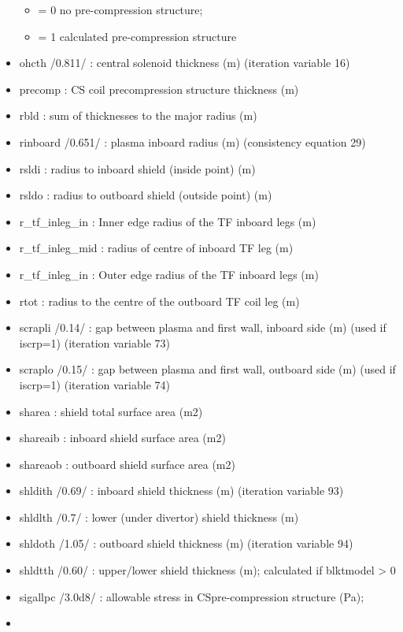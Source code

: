\documentclass[]{article}
\providecommand{\tightlist}{%
  \setlength{\itemsep}{0pt}\setlength{\parskip}{0pt}}
\begin{document}
\begin{itemize}
  \begin{itemize}
  \tightlist
  \item
    = 0 no pre-compression structure;
  \item
    = 1 calculated pre-compression structure
  \end{itemize}
\item
  ohcth /0.811/ : central solenoid thickness (m) (iteration variable 16)
\item
  precomp : CS coil precompression structure thickness (m)
\item
  rbld : sum of thicknesses to the major radius (m)
\item
  rinboard /0.651/ : plasma inboard radius (m) (consistency equation 29)
\item
  rsldi : radius to inboard shield (inside point) (m)
\item
  rsldo : radius to outboard shield (outside point) (m)
\item
  r\_tf\_inleg\_in : Inner edge radius of the TF inboard legs (m)
\item
  r\_tf\_inleg\_mid : radius of centre of inboard TF leg (m)
\item
  r\_tf\_inleg\_in : Outer edge radius of the TF inboard legs (m)
\item
  rtot : radius to the centre of the outboard TF coil leg (m)
\item
  scrapli /0.14/ : gap between plasma and first wall, inboard side (m)
  (used if iscrp=1) (iteration variable 73)
\item
  scraplo /0.15/ : gap between plasma and first wall, outboard side (m)
  (used if iscrp=1) (iteration variable 74)
\item
  sharea : shield total surface area (m2)
\item
  shareaib : inboard shield surface area (m2)
\item
  shareaob : outboard shield surface area (m2)
\item
  shldith /0.69/ : inboard shield thickness (m) (iteration variable 93)
\item
  shldlth /0.7/ : lower (under divertor) shield thickness (m)
\item
  shldoth /1.05/ : outboard shield thickness (m) (iteration variable 94)
\item
  shldtth /0.60/ : upper/lower shield thickness (m); calculated if
  blktmodel \textgreater{} 0
\item
  sigallpc /3.0d8/ : allowable stress in CSpre-compression structure
  (Pa);
\item

\end{itemize}
\end{document}
